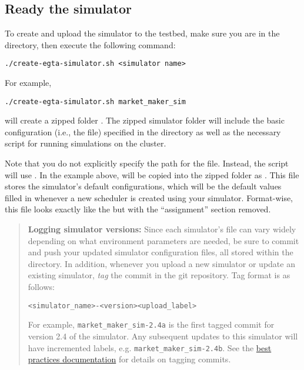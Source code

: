 \documentclass[11pt]{article}
\begin{document}
\subsection{Ready the simulator}
To create and upload the simulator to the testbed, make sure you are in the  directory, then execute the following command:
\begin{verbatim}
./create-egta-simulator.sh <simulator name>
\end{verbatim}
For example, 
\begin{verbatim}
./create-egta-simulator.sh market_maker_sim
\end{verbatim}
will create a zipped folder . The zipped simulator folder will include the basic configuration (i.e., the  file) specified in the  directory as well as the necessary  script for running simulations on the cluster.

Note that you do not explicitly specify the path for the  file. Instead, the script will use .
In the example above,  will be copied into the zipped folder as .
This  file stores the simulator's default configurations, which will be the default values filled in whenever a new scheduler is created using your simulator.
Format-wise, this  file looks exactly like the  but with the ``assignment'' section removed.


\begin{quote}
\textbf{Logging simulator versions:} Since each simulator's  file can vary widely depending on what environment parameters are needed, be sure to commit and push your updated simulator configuration files, all stored within the  directory. In addition, whenever you upload a new simulator or update an existing simulator, \emph{tag} the commit in the git repository. Tag format is as follows:
\begin{verbatim}
<simulator_name>-<version><upload_label>
\end{verbatim}
For example, \verb|market_maker_sim-2.4a| is the first tagged commit for version 2.4 of the  simulator. Any subsequent updates to this simulator will have incremented labels, e.g. \verb|market_maker_sim-2.4b|.
See the \href{best_practices.pdf}{best practices documentation} for details on tagging commits.
\end{quote}
\end{document}
